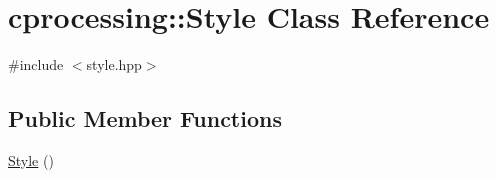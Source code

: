 \hypertarget{classcprocessing_1_1Style}{\section{cprocessing\-:\-:\-Style \-Class \-Reference}
\label{classcprocessing_1_1Style}
}


{\ttfamily \#include $<$style.\-hpp$>$}

\subsection*{\-Public \-Member \-Functions}
\begin{DoxyCompactItemize}
\item 
\hyperlink{classcprocessing_1_1Style_a914f187818eb30c0cebe3df5378bfa0a}{\-Style} ()
\end{DoxyCompactItemize}
